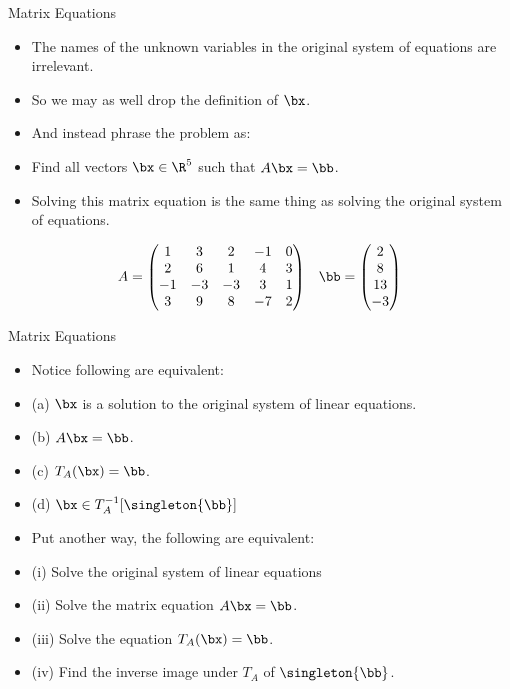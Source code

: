 \documentclass{beamer}
\begin{document}


\begin{frame}{Matrix Equations}

\begin{itemize}
\item The names of the unknown variables in the original system of equations
are irrelevant.
\item So we may as well drop the definition of $\bx$.
\item And instead phrase the problem as:
\item Find all vectors $\bx \in \R^5$ such that $A \bx = \bb$.
\item Solving this matrix equation is the same thing as solving the
original system of equations.

\end{itemize}

$$
\begin{matrix}
A =
\begin{pmatrix}
1 & 3 & 2 & -1 & 0 \\
2 & 6 & 1 & 4 & 3\\
-1 & -3 & -3 & 3 & 1 \\
3 & 9 & 8 & -7 & 2
\end{pmatrix}
&
\bb =
\begin{pmatrix}
2 \\ 8 \\ 13 \\ -3
\end{pmatrix}
\end{matrix}
$$

\end{frame}



\begin{frame}{Matrix Equations}

\begin{itemize}
\item Notice following are equivalent:
\item (a) $\bx$ is a solution to the original system of linear equations.
\item (b) $A \bx = \bb$.
\item (c) $T_A(\bx) = \bb$.
\item (d) $\bx \in T_A^{-1}[\singleton{\bb}]$
\item Put another way, the following are equivalent:
\item (i) Solve the original system of linear equations
\item (ii) Solve the matrix equation $A \bx = \bb$.
\item (iii) Solve the equation $T_A(\bx) = \bb$.
\item (iv) Find the inverse image under $T_A$ of $\singleton{\bb}$.
\end{itemize}

\end{frame}
\end{document}
